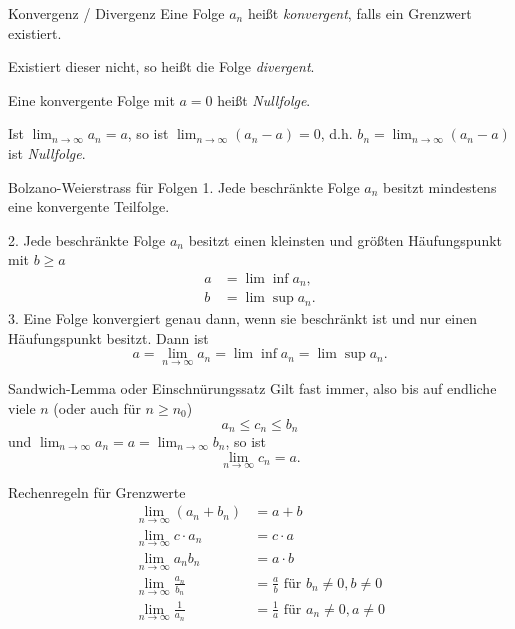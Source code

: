 \documentclass[german]{spicker}
\begin{document}
\begin{defi}{Konvergenz / Divergenz}
    Eine Folge $a_n$ heißt \emph{konvergent}, falls ein Grenzwert existiert.

    Existiert dieser nicht, so heißt die Folge \emph{divergent}.

    Eine konvergente Folge mit $a=0$ heißt \emph{Nullfolge}.

    Ist $\lim_{n\to\infty}a_n = a$, so ist $\lim_{n\to\infty}(a_n-a) = 0$, d.h. $b_n=\lim_{n\to\infty}(a_n-a)$ ist \emph{Nullfolge}.
\end{defi}

\begin{defi}{Bolzano-Weierstrass für Folgen}
    1. Jede beschränkte Folge $a_n$ besitzt mindestens eine konvergente Teilfolge.

    2. Jede beschränkte Folge $a_n$ besitzt einen kleinsten und größten Häufungspunkt mit $b \geq a$
    $$
        \begin{aligned}
            a & = \lim\inf a_n, \\
            b & = \lim\sup a_n.
        \end{aligned}
    $$
    3. Eine Folge konvergiert genau dann, wenn sie beschränkt ist und nur einen Häufungspunkt besitzt. Dann ist
    $$
        a = \lim_{n\to\infty} a_n = \lim\inf a_n = \lim\sup a_n.
    $$
\end{defi}

\begin{defi}{Sandwich-Lemma oder Einschnürungssatz}
    Gilt fast immer, also bis auf endliche viele $n$ (oder auch für $n \geq n_0$)
    $$
        a_n \leq c_n \leq b_n
    $$
    und $\lim_{n\to\infty}a_n = a = \lim_{n\to\infty}b_n$, so ist
    $$
        \lim_{n\to\infty}c_n = a.
    $$
\end{defi}

\begin{bonus}{Rechenregeln für Grenzwerte}
    $$
        \begin{aligned}
            \lim_{n\to\infty} (a_n + b_n)     & = a+b                                          \\
            \lim_{n\to\infty} c\cdot a_n      & = c \cdot a                                    \\
            \lim_{n\to\infty} a_nb_n          & = a \cdot b                                    \\
            \lim_{n\to\infty} \frac{a_n}{b_n} & = \frac{a}{b} \text{ für } b_n \neq 0, b\neq 0 \\
            \lim_{n\to\infty} \frac{1}{a_n}   & = \frac{1}{a} \text{ für } a_n \neq 0, a\neq 0
        \end{aligned}
    $$
\end{bonus}
\end{document}

